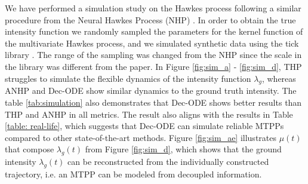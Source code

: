 We have performed a simulation study on the Hawkes process following a similar procedure from the Neural Hawkes Process (NHP) \cite{bib:nhp}. 
In order to obtain the true intensity function we randomly sampled the parameters for the kernel function of the multivariate Hawkes process, and we simulated synthetic data using the tick library \cite{bacry2018tick}. 
The range of the sampling was changed from the NHP since the scale in the library was different from the paper.
In Figure \ref{fig:sim_a} - \ref{fig:sim_d}, THP struggles to simulate the flexible dynamics of the intensity function $\lambda_g$, whereas ANHP and Dec-ODE show similar dynamics to the ground truth intensity. 
The table \ref{tab:simulation} also demonstrates that Dec-ODE shows better results than THP and ANHP in all metrics. 
The result also aligns with the results in Table \ref{table: real-life}, which suggests that Dec-ODE can simulate reliable MTPPs compared to other state-of-the-art methods. 
Figure \ref{fig:sim_ae} illustrates $\mu(t)$ that compose $\lambda_g(t)$ from Figure \ref{fig:sim_d}, which shows that the ground intensity $\lambda_g(t)$ can be reconstructed from the individually constructed trajectory, i.e. an MTPP can be modeled from decoupled information.

